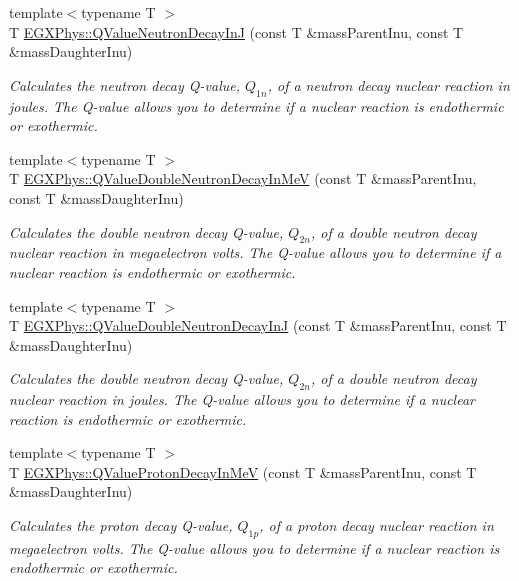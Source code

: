 \begin{DoxyCompactItemize}
{\footnotesize template$<$typename T $>$ }\\T \hyperlink{group___q_value_gab9ffbd12c3f814e03f0ed1fbdcba0700}{E\+G\+X\+Phys\+::\+Q\+Value\+Neutron\+Decay\+InJ} (const T \&mass\+Parent\+Inu, const T \&mass\+Daughter\+Inu)
\begin{DoxyCompactList}\small\item\em Calculates the neutron decay Q-\/value, $Q_{1n}$, of a neutron decay nuclear reaction in joules. The Q-\/value allows you to determine if a nuclear reaction is endothermic or exothermic. \end{DoxyCompactList}\item 
{\footnotesize template$<$typename T $>$ }\\T \hyperlink{group___q_value_ga6bfea723aca78b32ea67cc1ca7b4031b}{E\+G\+X\+Phys\+::\+Q\+Value\+Double\+Neutron\+Decay\+In\+MeV} (const T \&mass\+Parent\+Inu, const T \&mass\+Daughter\+Inu)
\begin{DoxyCompactList}\small\item\em Calculates the double neutron decay Q-\/value, $Q_{2n}$, of a double neutron decay nuclear reaction in megaelectron volts. The Q-\/value allows you to determine if a nuclear reaction is endothermic or exothermic. \end{DoxyCompactList}\item 
{\footnotesize template$<$typename T $>$ }\\T \hyperlink{group___q_value_gada1ace2aa0a791df382f120767a56fe9}{E\+G\+X\+Phys\+::\+Q\+Value\+Double\+Neutron\+Decay\+InJ} (const T \&mass\+Parent\+Inu, const T \&mass\+Daughter\+Inu)
\begin{DoxyCompactList}\small\item\em Calculates the double neutron decay Q-\/value, $Q_{2n}$, of a double neutron decay nuclear reaction in joules. The Q-\/value allows you to determine if a nuclear reaction is endothermic or exothermic. \end{DoxyCompactList}\item 
{\footnotesize template$<$typename T $>$ }\\T \hyperlink{group___q_value_ga514354518df3bf1cde561b6d75879ef0}{E\+G\+X\+Phys\+::\+Q\+Value\+Proton\+Decay\+In\+MeV} (const T \&mass\+Parent\+Inu, const T \&mass\+Daughter\+Inu)
\begin{DoxyCompactList}\small\item\em Calculates the proton decay Q-\/value, $Q_{1p}$, of a proton decay nuclear reaction in megaelectron volts. The Q-\/value allows you to determine if a nuclear reaction is endothermic or exothermic. \end{DoxyCompactList}\item 

\end{DoxyCompactItemize}
